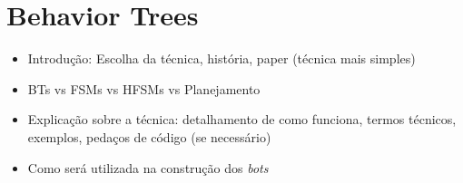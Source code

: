 \chapter{\label{chap:behavior-trees}Behavior Trees}

\begin{itemize}
    \item
        Introdução: Escolha da técnica, história, paper (técnica mais simples)
    \item
        BTs vs FSMs vs HFSMs vs Planejamento
    \item
        Explicação sobre a técnica: detalhamento de como funciona, termos
        técnicos, exemplos, pedaços de código (se necessário)
    \item
        Como será utilizada na construção dos \textit{bots}
\end{itemize}

